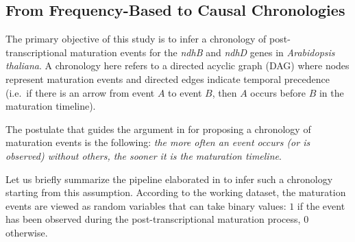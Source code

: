 \documentclass[
]{article}
\theoremstyle{definition}
\theoremstyle{remark}
\begin{document}
\begin{table}
\begin{minipage}{\linewidth}


\end{minipage}%

\end{table}%

\subsection{From Frequency-Based to Causal
Chronologies}\label{sec-paradigm-shift}

The primary objective of this study is to infer a chronology of
post-transcriptional maturation events for the \emph{ndhB} and
\emph{ndhD} genes in \emph{Arabidopsis thaliana}. A chronology here
refers to a directed acyclic graph (DAG) where nodes represent
maturation events and directed edges indicate temporal precedence
(i.e.~if there is an arrow from event \(A\) to event \(B\), then \(A\)
occurs before \(B\) in the maturation timeline).

The postulate that guides the argument in
 for proposing a
chronology of maturation events is the following: \emph{the more often
an event occurs (or is observed) without others, the sooner it is the
maturation timeline}.

Let us briefly summarize the pipeline elaborated in
 to infer such a
chronology starting from this assumption. According to the working
dataset, the maturation events are viewed as random variables that can
take binary values: \(1\) if the event has been observed during the
post-transcriptional maturation process, \(0\) otherwise.
\end{document}
